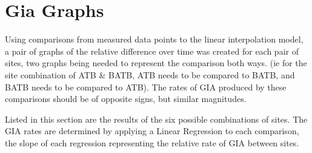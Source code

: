 

\section{Gia Graphs}

Using comparisons from measured data points to the linear interpolation model,
a pair of graphs of the relative difference over time was created for each pair
of sites, two graphs being needed to represent the comparison both ways. (ie for
the site combination of ATB \& BATB, ATB needs to be compared to BATB, and BATB
needs to be compared to ATB). The rates of GIA produced by these comparisons
should be of opposite signs, but similar magnitudes.

Listed in this section are the results of the six possible combinations of sites.
The GIA rates are determined by applying a Linear Regression to each comparison,
the slope of each regression representing the relative rate of GIA between sites.

